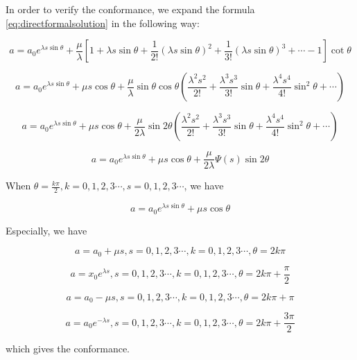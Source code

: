 
In order to verify the conformance, we expand the formula \eqref{eq:directformalsolution} in the following way:

\begin{equation}
   a =  a_0 e^{\lambda s \sin \theta} + \frac{\mu}{\lambda} [1 + \lambda s \sin \theta + \frac{1}{2!} (\lambda s \sin \theta)^2  + \frac{1}{3!} (\lambda s \sin \theta)^3 + \cdots - 1] \cot \theta
\end{equation}

\begin{equation}
   a = a_0 e^{\lambda s \sin \theta} + \mu s \cos \theta + \frac{\mu}{\lambda} \sin \theta \cos \theta (\frac{\lambda^2s^2}{2!} + \frac{\lambda^3s^3}{3!} \sin \theta + \frac{\lambda^4s^4}{4!} \sin^2 \theta + \cdots)
\end{equation}

\begin{equation}
   a = a_0 e^{\lambda s \sin \theta} + \mu s \cos \theta + \frac{\mu}{2\lambda} \sin 2\theta (\frac{\lambda^2s^2}{2!} + \frac{\lambda^3s^3}{3!} \sin \theta + \frac{\lambda^4s^4}{4!} \sin^2 \theta + \cdots)
\end{equation}

\begin{equation}
   a = a_0 e^{\lambda s \sin \theta} + \mu s \cos \theta + \frac{\mu}{2\lambda} \Psi(s) \sin 2\theta
\end{equation}

When $\theta = \frac{k \pi}{2}, k = 0, 1, 2, 3\cdots, s = 0, 1, 2, 3\cdots$, we have

\begin{equation}
    a = a_0 e^{\lambda s \sin \theta} + \mu s \cos \theta
\end{equation}

Especially, we have

\begin{equation}
    a = a_0 + \mu s, s = 0, 1, 2, 3\cdots, k = 0, 1, 2, 3\cdots, \theta = 2k\pi
\end{equation}

\begin{equation}
    a = x_0e^{\lambda s}, s = 0, 1, 2, 3\cdots, k = 0, 1, 2, 3\cdots, \theta = 2k\pi + \frac{\pi}{2}
\end{equation}

\begin{equation}
    a = a_0 - \mu s, s = 0, 1, 2, 3\cdots, k = 0, 1, 2, 3\cdots, \theta = 2k\pi + \pi
\end{equation}

\begin{equation}
    a = a_0 e^{- \lambda s}, s = 0, 1, 2, 3\cdots, k = 0, 1, 2, 3\cdots, \theta = 2k\pi + \frac{3 \pi}{2}
\end{equation}

which gives the conformance.

